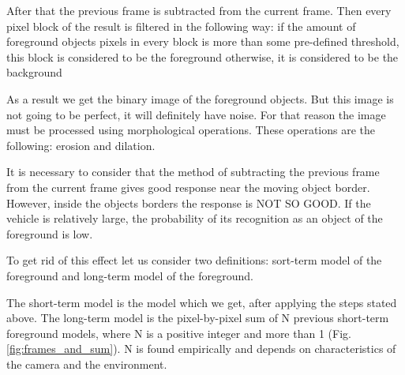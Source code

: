 \documentclass[12pt,a4paper,oneside,titlepage]{article}
\begin{document}
After that the previous frame is subtracted from the current frame.
Then every pixel block of the result is filtered in the following way:
if the amount of foreground objects pixels in every block is more than some pre-defined threshold, this block is considered to be the foreground
otherwise, it is considered to be the background

As a result we get the binary image of the foreground objects.
But this image is not going to be perfect, it will definitely have noise.
For that reason the image must be processed using morphological operations.
These operations are the following: erosion and dilation.

It is necessary to consider that the method of subtracting the previous frame from the current frame gives good response near the moving object border. 
However, inside the objects borders the response is NOT SO GOOD.
If the vehicle is relatively large, the probability of its recognition as an object of the foreground is low.

To get rid of this effect let us consider two definitions: sort-term model of the foreground and long-term model of the foreground.

The short-term model is the model which we get, after applying the steps stated above.
The long-term model is the pixel-by-pixel sum of N previous short-term foreground models, where N is a positive integer and more than 1 (Fig.\ref{fig:frames_and_sum}).
N is found empirically and depends on characteristics of the camera and the environment.
\end{document}
